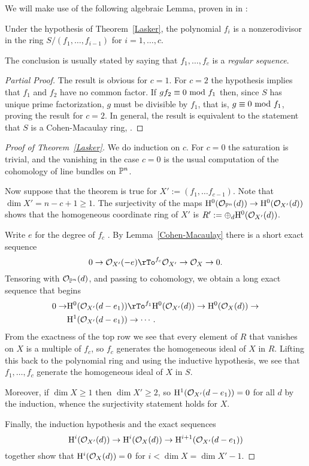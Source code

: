 We will make use of the following algebraic Lemma, proven in  in \cite[Theorem 18.***]{Eisenbud95}:

\begin{lemma}\label{Cohen-Macaulay}
 Under the hypothesis of Theorem~\ref{Lasker}, the polynomial $f_{i}$ is a nonzerodivisor in the ring 
$S/(f_{1}, \dots, f_{i-1})$ for $i = 1, \dots, c$.
\end{lemma}

The conclusion is usually stated by saying that   $f_{1}, \dots, f_{c}$ is a \emph{regular sequence}.

\begin{proof}[Partial Proof]
 The result is obvious for $c=1$. For $c=2$ the hypothesis implies that $f_{1}$ and $f_{2}$ have no common factor.
If $g f_{2} \equiv 0\ {\rm mod}\ f_{1}$ then, since $S$ has unique prime factorization, $g$ must be divisible by
$f_{1}$, that is, $g  \equiv 0\ {\rm mod}\ f_{1}$, proving the result for $c=2$. In general, the result is equivalent to the 
statement that $S$ is a Cohen-Macaulay ring,  \cite[Proposition 18.9]{Eisenbud95}.
\end{proof}


\begin{proof} [Proof of Theorem~\ref{Lasker}] We do induction on $c$. For $c=0$ the saturation is trivial, and the vanishing in the case $c=0$ is the usual computation of the cohomology of line bundles on $\PP^{n}$. 

Now suppose that the theorem is true for $X' := (f_{1}, \dots f_{c-1})$. Note that $\dim X' = n-c+1\geq 1$.
 The surjectivity of 
the maps $\HH^{0}(\cO_{\PP^{n}}(d)) \to \HH^{0}(\cO_{X'}(d))$ shows that the homogeneous coordinate ring
of $X'$ is $R':=\oplus_{d} \HH^{0}(\cO_{X'}(d))$.

Write $e$ for the degree of $f_{c}$ . By Lemma~\ref{Cohen-Macaulay} there is a short
exact sequence
$$
0\to \cO_{X'}(-e) \rTo^{f_{c}} \cO_{X'} \to \cO_{X} \to 0.
$$
Tensoring with $\cO_{\PP^{n}}(d)$, and passing to cohomology, we obtain a long exact sequence that begins
\begin{align*}
0\to &\HH^{0}(\cO_{X'}(d-e_{1})) \rTo^{f_{1}}  \HH^{0}(\cO_{X'}(d)) \to  \HH^{0}(\cO_{X}(d))\to\\
&\HH^{1}(\cO_{X'}(d-e_{1}))\to \cdots .
\end{align*}
From the exactness of the top row we see that every element of $R$ 
that vanishes on $X$ is a multiple of $f_{c}$, so $f_{c}$ generates the homogeneous ideal of $X$ in $R$.
Lifting this back to the polynomial ring and using
 the inductive hypothesis, we see that $f_{1},\dots, f_{c}$ generate the homogeneous ideal of
$X$ in $S$.

Moreover, if $\dim X\geq 1$ then $\dim X' \geq 2$, so $\HH^{1}(\cO_{X'}(d-e_{1})) = 0$ for all $d$ by the induction,
whence the surjectivity statement holds for $X$.

Finally, the induction hypothesis and the exact sequences
$$
\HH^{i}(\cO_{X'}(d)) \to  \HH^{i}(\cO_{X}(d))\to \HH^{i+1}(\cO_{X'}(d-e_{1}))
$$
together show that $\HH^{i}(\cO_{X}(d)) = 0$ for $i<\dim X = \dim X'-1$.

\end{proof}

